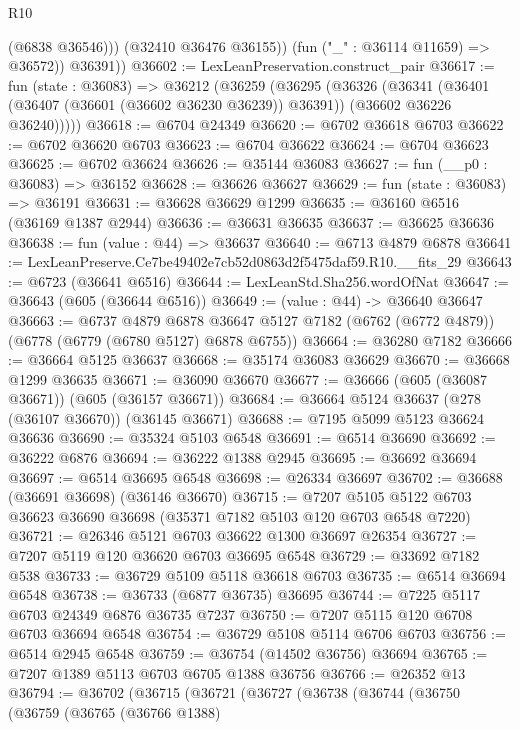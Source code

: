 \begin{lexlean}{R10}
\begin{coremodule}
                (@6838 @36546)))
            (@32410 @36476 @36155))
          (fun ("_" : @36114 @11659) => @36572))
        @36391))
@36602 := LexLeanPreservation.construct_pair
@36617 := fun (state : @36083) =>
  @36212
    (@36259
      (@36295
        (@36326
          (@36341
            (@36401 (@36407 (@36601 (@36602 @36230 @36239)) @36391))
            (@36602 @36226 @36240)))))
@36618 := @6704 @24349
@36620 := @6702 @36618 @6703
@36622 := @6702 @36620 @6703
@36623 := @6704 @36622
@36624 := @6704 @36623
@36625 := @6702 @36624
@36626 := @35144 @36083
@36627 := fun (__p0 : @36083) => @36152
@36628 := @36626 @36627
@36629 := fun (state : @36083) => @36191
@36631 := @36628 @36629 @1299
@36635 := @36160 @6516 (@36169 @1387 @2944)
@36636 := @36631 @36635
@36637 := @36625 @36636
@36638 := fun (value : @44) => @36637
@36640 := @6713 @4879 @6878
@36641 := LexLeanPreserve.Ce7be49402e7cb52d0863d2f5475daf59.R10.__fits_29
@36643 := @6723 (@36641 @6516)
@36644 := LexLeanStd.Sha256.wordOfNat
@36647 := @36643 (@605 (@36644 @6516))
@36649 := (value : @44) -> @36640 @36647
@36663 := @6737
    @4879
    @6878
    @36647
    @5127
    @7182
    (@6762 (@6772 @4879))
    (@6778 (@6779 (@6780 @5127) @6878 @6755))
@36664 := @36280 @7182
@36666 := @36664 @5125 @36637
@36668 := @35174 @36083 @36629
@36670 := @36668 @1299 @36635
@36671 := @36090 @36670
@36677 := @36666 (@605 (@36087 @36671)) (@605 (@36157 @36671))
@36684 := @36664 @5124 @36637 (@278 (@36107 @36670)) (@36145 @36671)
@36688 := @7195 @5099 @5123 @36624 @36636
@36690 := @35324 @5103 @6548
@36691 := @6514 @36690
@36692 := @36222 @6876
@36694 := @36222 @1388 @2945
@36695 := @36692 @36694
@36697 := @6514 @36695 @6548
@36698 := @26334 @36697
@36702 := @36688 (@36691 @36698) (@36146 @36670)
@36715 := @7207 @5105 @5122 @6703 @36623 @36690 @36698 (@35371 @7182 @5103 @120 @6703 @6548 @7220)
@36721 := @26346 @5121 @6703 @36622 @1300 @36697 @26354
@36727 := @7207 @5119 @120 @36620 @6703 @36695 @6548
@36729 := @33692 @7182 @538
@36733 := @36729 @5109 @5118 @36618 @6703
@36735 := @6514 @36694 @6548
@36738 := @36733 (@6877 @36735) @36695
@36744 := @7225 @5117 @6703 @24349 @6876 @36735 @7237
@36750 := @7207 @5115 @120 @6708 @6703 @36694 @6548
@36754 := @36729 @5108 @5114 @6706 @6703
@36756 := @6514 @2945 @6548
@36759 := @36754 (@14502 @36756) @36694
@36765 := @7207 @1389 @5113 @6703 @6705 @1388 @36756
@36766 := @26352 @13
@36794 := @36702
    (@36715
      (@36721
        (@36727
          (@36738
            (@36744
              (@36750
                (@36759
                  (@36765
                    (@36766 @1388)

\end{coremodule}
\end{lexlean}
